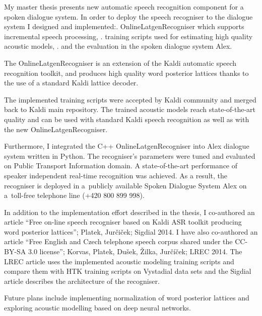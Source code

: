 My master thesis presents new automatic speech recognition component for a spoken dialogue system.
In order to deploy the speech recogniser to the dialogue system I designed and implemented:\hfil\break\hfil{}. OnlineLatgenRecogniser which supports incremental speech processing, \hfil{}. training scripts used for estimating high quality acoustic models, \hfil{}. and the evaluation in the spoken dialogue system Alex.\hfil\break

The OnlineLatgenRecogniser is an extension of the Kaldi automatic speech recognition toolkit, and
produces high quality word posterior lattices thanks to the use of a standard Kaldi lattice decoder.

The implemented training scripts were accepted by Kaldi community and merged back to Kaldi main repository. 
The trained acoustic models reach state-of-the-art quality and can be used with standard Kaldi speech recognition as well as with the new OnlineLatgenRecogniser. 

Furthermore, I integrated the C++ OnlineLatgenRecogniser into Alex dialogue system written in Python. 
The recogniser's parameters were tuned and evaluated on Public Transport Information domain. 
A state-of-the-art performance of speaker independent real-time recognition was achieved. 
As a result, the recogniser is deployed in a~publicly available Spoken Dialogue System Alex on a~toll-free telephone line (+420 800 899 998).

In addition to the implementation effort described in the thesis, I co-authored an article ``Free on-line speech recogniser based on Kaldi ASR toolkit producing word posterior lattices''; Platek, Jur\v{c}i\v{c}ek; Sigdial 2014. I have also co-authored an article ``Free English and Czech telephone speech corpus shared under the CC-BY-SA 3.0 license''; Korvas, Platek, Du\v{s}ek, \v{Z}ilka, Jur\v{c}\'{i}\v{c}ek; LREC 2014. The LREC article uses the implemented acoustic modeling training scripts and compare them with HTK training scripts on Vystadial data sets and the Sigdial article describes the architecture of the recogniser. 

Future plans include implementing normalization of word posterior lattices and exploring acoustic modelling based on deep neural networks.
